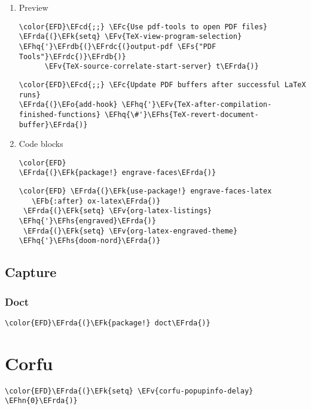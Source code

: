 \documentclass[12pt]{article}
\theoremstyle{plain}%
\theoremstyle{definition}
\theoremstyle{remark}
\newcommand{\EFc}[1]{\textcolor{EFc}{#1}} %
\newcommand{\EFcd}[1]{\textcolor{EFcd}{#1}} %
\newcommand{\EFs}[1]{\textcolor{EFs}{#1}} %
\newcommand{\EFk}[1]{\textcolor{EFk}{#1}} %
\newcommand{\EFb}[1]{\textcolor{EFb}{#1}} %
\newcommand{\EFv}[1]{\textcolor{EFv}{#1}} %
\newcommand{\EFo}[1]{\textcolor{EFo}{#1}} %
\newcommand{\EFhn}[1]{\textcolor{EFhn}{\textbf{#1}}} %
\newcommand{\EFhq}[1]{\textcolor{EFhq}{#1}} %
\newcommand{\EFhs}[1]{\textcolor{EFhs}{#1}} %
\newcommand{\EFrda}[1]{\textcolor{EFrda}{#1}} %
\newcommand{\EFrdb}[1]{\textcolor{EFrdb}{#1}} %
\newcommand{\EFrdc}[1]{\textcolor{EFrdc}{#1}} %
\begin{document}
\begin{enumerate}
\item Preview
\label{sec:orgda4093c}
\begin{Code}
\begin{Verbatim}
\color{EFD}\EFcd{;;} \EFc{Use pdf-tools to open PDF files}
\EFrda{(}\EFk{setq} \EFv{TeX-view-program-selection} \EFhq{'}\EFrdb{(}\EFrdc{(}output-pdf \EFs{"PDF Tools"}\EFrdc{)}\EFrdb{)}
      \EFv{TeX-source-correlate-start-server} t\EFrda{)}
\end{Verbatim}
\end{Code}
\begin{Code}
\begin{Verbatim}
\color{EFD}\EFcd{;;} \EFc{Update PDF buffers after successful LaTeX runs}
\EFrda{(}\EFo{add-hook} \EFhq{'}\EFv{TeX-after-compilation-finished-functions} \EFhq{\#'}\EFhs{TeX-revert-document-buffer}\EFrda{)}
\end{Verbatim}
\end{Code}
\item Code blocks
\label{sec:orgd4e754d}
\begin{Code}
\begin{Verbatim}
\color{EFD}
\EFrda{(}\EFk{package!} engrave-faces\EFrda{)}
\end{Verbatim}
\end{Code}
\begin{Code}
\begin{Verbatim}
\color{EFD} \EFrda{(}\EFk{use-package!} engrave-faces-latex
   \EFb{:after} ox-latex\EFrda{)}
 \EFrda{(}\EFk{setq} \EFv{org-latex-listings} \EFhq{'}\EFhs{engraved}\EFrda{)}
 \EFrda{(}\EFk{setq} \EFv{org-latex-engraved-theme} \EFhq{'}\EFhs{doom-nord}\EFrda{)}
\end{Verbatim}
\end{Code}
\end{enumerate}
\subsection{Capture}
\label{sec:org608d4bf}
\subsubsection{Doct}
\label{sec:orgd1ea177}
\begin{Code}
\begin{Verbatim}
\color{EFD}\EFrda{(}\EFk{package!} doct\EFrda{)}
\end{Verbatim}
\end{Code}
\section{Corfu}
\label{sec:orgc0302cd}
\begin{Code}
\begin{Verbatim}
\color{EFD}\EFrda{(}\EFk{setq} \EFv{corfu-popupinfo-delay} \EFhn{0}\EFrda{)}
\end{Verbatim}
\end{Code}
\end{document}
